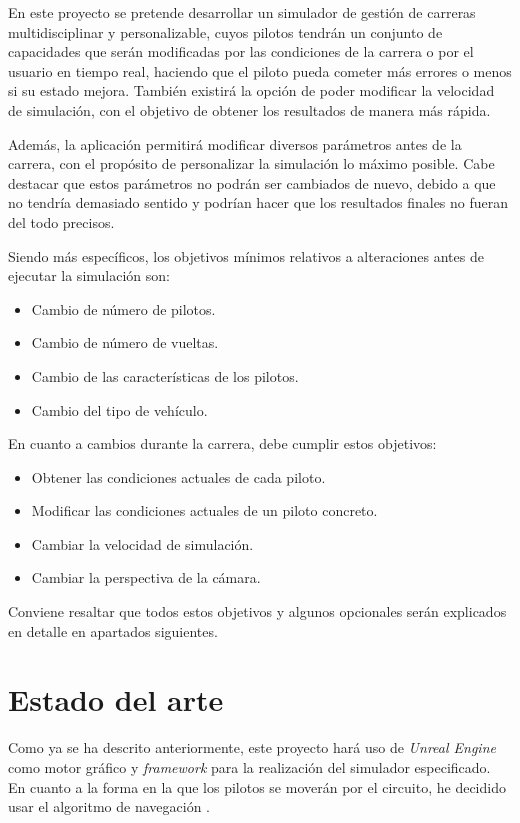 En este proyecto se pretende desarrollar un simulador de gestión de carreras multidisciplinar y personalizable, cuyos pilotos tendrán un conjunto de capacidades que serán modificadas por las condiciones de la carrera o por el usuario en tiempo real, haciendo que el piloto pueda cometer más errores o menos si su estado mejora. También existirá la opción de poder modificar la velocidad de simulación, con el objetivo de obtener los resultados de manera más rápida.

\bigskip

Además, la aplicación permitirá modificar diversos parámetros antes de la carrera, con el propósito de personalizar la simulación lo máximo posible. Cabe destacar que estos parámetros no podrán ser cambiados de nuevo, debido a que no tendría demasiado sentido y podrían hacer que los resultados finales no fueran del todo precisos.


\bigskip


Siendo más específicos, los objetivos mínimos relativos a alteraciones antes de ejecutar la simulación son:

\begin{itemize}
   \item Cambio de número de pilotos.
   \item Cambio de número de vueltas.
   \item Cambio de las características de los pilotos.
   \item Cambio del tipo de vehículo.
\end{itemize}

\bigskip

En cuanto a cambios durante la carrera, debe cumplir estos objetivos:

\begin{itemize}
   \item Obtener las condiciones actuales de cada piloto.
   \item Modificar las condiciones actuales de un piloto concreto.
   \item Cambiar la velocidad de simulación.
   \item Cambiar la perspectiva de la cámara.
\end{itemize}

Conviene resaltar que todos estos objetivos y algunos opcionales serán explicados en detalle en apartados siguientes.

\section{Estado del arte}
Como ya se ha descrito anteriormente, este proyecto hará uso de \textit{Unreal Engine} como motor gráfico y \textit{framework} para la realización del simulador especificado. En cuanto a la forma en la que los pilotos se moverán por el circuito, he decidido usar el algoritmo de navegación \finalAlg.

